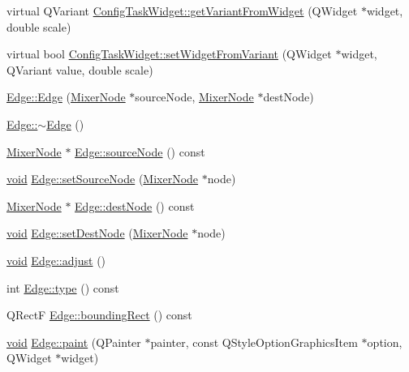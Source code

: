 \begin{DoxyCompactItemize}
\item 
virtual \-Q\-Variant \hyperlink{group___u_a_v_object_widget_utils_ga0bc84dd39dc77fccf26bf3a708a11733}{\-Config\-Task\-Widget\-::get\-Variant\-From\-Widget} (\-Q\-Widget $\ast$widget, double scale)
\item 
virtual bool \hyperlink{group___u_a_v_object_widget_utils_gac37260311f36d40dcb9dce65e025c426}{\-Config\-Task\-Widget\-::set\-Widget\-From\-Variant} (\-Q\-Widget $\ast$widget, \-Q\-Variant value, double scale)
\item 
\hyperlink{group___u_a_v_object_widget_utils_gaaaf462ed746395725efc1ecc8ea00ec4}{\-Edge\-::\-Edge} (\hyperlink{class_mixer_node}{\-Mixer\-Node} $\ast$source\-Node, \hyperlink{class_mixer_node}{\-Mixer\-Node} $\ast$dest\-Node)
\item 
\hyperlink{group___u_a_v_object_widget_utils_ga2f37b72f044427961d6730943daf10e0}{\-Edge\-::$\sim$\-Edge} ()
\item 
\hyperlink{class_mixer_node}{\-Mixer\-Node} $\ast$ \hyperlink{group___u_a_v_object_widget_utils_ga9d06da5f40991dc21459764c5e3783b1}{\-Edge\-::source\-Node} () const 
\item 
\hyperlink{group___u_a_v_objects_plugin_ga444cf2ff3f0ecbe028adce838d373f5c}{void} \hyperlink{group___u_a_v_object_widget_utils_gacc2025ad40fdd1225c77d3814bd356d2}{\-Edge\-::set\-Source\-Node} (\hyperlink{class_mixer_node}{\-Mixer\-Node} $\ast$node)
\item 
\hyperlink{class_mixer_node}{\-Mixer\-Node} $\ast$ \hyperlink{group___u_a_v_object_widget_utils_ga63800818ac0cf98ea9cff4ba44532c4d}{\-Edge\-::dest\-Node} () const 
\item 
\hyperlink{group___u_a_v_objects_plugin_ga444cf2ff3f0ecbe028adce838d373f5c}{void} \hyperlink{group___u_a_v_object_widget_utils_gac291239456c76a2347f0d94e1aa8b14c}{\-Edge\-::set\-Dest\-Node} (\hyperlink{class_mixer_node}{\-Mixer\-Node} $\ast$node)
\item 
\hyperlink{group___u_a_v_objects_plugin_ga444cf2ff3f0ecbe028adce838d373f5c}{void} \hyperlink{group___u_a_v_object_widget_utils_gab554a765fd7a57fcdf289aa51b4df328}{\-Edge\-::adjust} ()
\item 
int \hyperlink{group___u_a_v_object_widget_utils_ga8ad60980ad4024691e462442f64eb7d2}{\-Edge\-::type} () const 
\item 
\-Q\-Rect\-F \hyperlink{group___u_a_v_object_widget_utils_ga1715832a609af81720fbed8340ddcd51}{\-Edge\-::bounding\-Rect} () const 
\item 
\hyperlink{group___u_a_v_objects_plugin_ga444cf2ff3f0ecbe028adce838d373f5c}{void} \hyperlink{group___u_a_v_object_widget_utils_ga6fb73701d0e4739f569e1ea0eb4c36fa}{\-Edge\-::paint} (\-Q\-Painter $\ast$painter, const \-Q\-Style\-Option\-Graphics\-Item $\ast$option, \-Q\-Widget $\ast$widget)

\end{DoxyCompactItemize}
